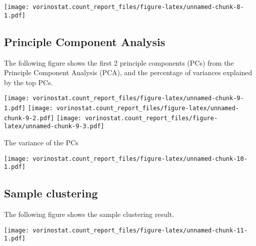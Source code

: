 \documentclass[]{article}
\begin{document}
\texttt{[image: vorinostat.count\_report\_files/figure-latex/unnamed-chunk-8-1.pdf]}

\hypertarget{principle-component-analysis}{%
\subsection{Principle Component
Analysis}\label{principle-component-analysis}}

The following figure shows the first 2 principle components (PCs) from
the Principle Component Analysis (PCA), and the percentage of variances
explained by the top PCs.

\texttt{[image: vorinostat.count\_report\_files/figure-latex/unnamed-chunk-9-1.pdf]}
\texttt{[image: vorinostat.count\_report\_files/figure-latex/unnamed-chunk-9-2.pdf]}
\texttt{[image: vorinostat.count\_report\_files/figure-latex/unnamed-chunk-9-3.pdf]}

The variance of the PCs

\texttt{[image: vorinostat.count\_report\_files/figure-latex/unnamed-chunk-10-1.pdf]}

\hypertarget{sample-clustering}{%
\subsection{Sample clustering}\label{sample-clustering}}

The following figure shows the sample clustering result.

\texttt{[image: vorinostat.count\_report\_files/figure-latex/unnamed-chunk-11-1.pdf]}
\end{document}
